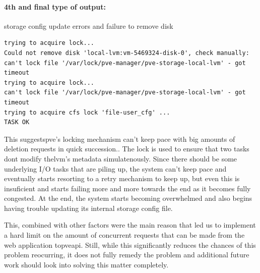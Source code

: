 \paragraph{4th and final type of output:} storage config update errors and failure to remove disk

        \begin{verbatim}
trying to acquire lock...
Could not remove disk 'local-lvm:vm-5469324-disk-0', check manually:
can't lock file '/var/lock/pve-manager/pve-storage-local-lvm' - got timeout
trying to acquire lock...
can't lock file '/var/lock/pve-manager/pve-storage-local-lvm' - got timeout
trying to acquire cfs lock 'file-user_cfg' ...
TASK OK
        \end{verbatim}
                
        This suggests\ac{pve}'s locking mechanism can't keep pace with big amounts of deletion requests in quick succession.. 
        The lock is used to ensure that two tasks dont modify the\ac{lvm}'s metadata simulatenously. Since there should be 
        some underlying I/O tasks that are piling up, the system can't keep pace and eventually starts resorting to a retry mechanism 
        to keep up, but even this is insuficient and starts failing more and more towards the end as it becomes fully congested. 
        At the end, the system starts becoming overwhelmed and also begins having trouble updating its internal storage 
        config file.  

        This, combined with other factors were the main reason that led us to implement a hard limit on the amount of concurrent 
        requests that can be made from the web application to\ac{pve}\ac{api}. Still, while this significantly reduces the chances 
        of this problem reocurring, it does not fully remedy the problem and additional future work should look into solving this 
        matter completely.




